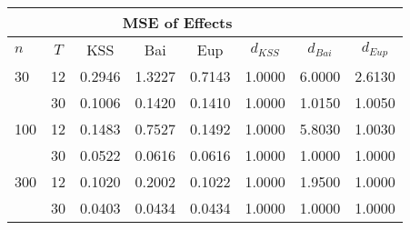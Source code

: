 \begin{tabular}{lccccccc} 
\hline \multicolumn{7}{c}{MSE of Effects} \\ \hline 
$n$ & $T$ & KSS & Bai & Eup & $d_{KSS}$ & $d_{Bai}$ & $d_{Eup}$ \\
\hline
30 & 12 &  0.2946  &  1.3227  &  0.7143  &  1.0000  &  6.0000  &  2.6130  \\
& 30 &  0.1006  &  0.1420  &  0.1410  &  1.0000  &  1.0150  &  1.0050  \\
100 & 12 &  0.1483  &  0.7527  &  0.1492  &  1.0000  &  5.8030  &  1.0030  \\
& 30 &  0.0522  &  0.0616  &  0.0616  &  1.0000  &  1.0000  &  1.0000  \\
300 & 12 &  0.1020  &  0.2002  &  0.1022  &  1.0000  &  1.9500  &  1.0000  \\
& 30 &  0.0403  &  0.0434  &  0.0434  &  1.0000  &  1.0000  &  1.0000  \\
\end{tabular} 
